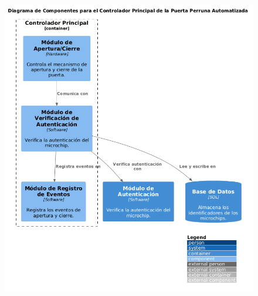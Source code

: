 \begin{figure}[h!] 
\centering
\includegraphics[scale=0.5]{Pictures/capt-asw/componentesPP.png}\caption{}
\end{figure}




